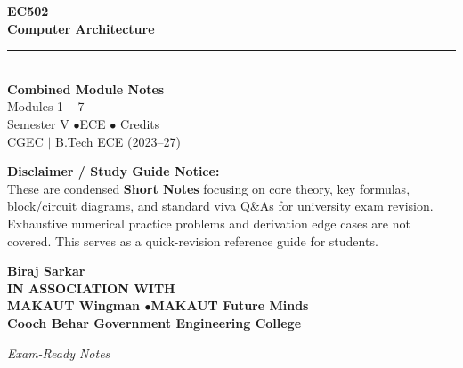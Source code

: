 \documentclass[12pt,a4paper]{article}
\begin{document}
\thispagestyle{empty}


\vspace*{1.0cm}
\begin{center}
  {\Huge\bfseries\color{myred} EC502}\\[10pt]
  {\LARGE\bfseries\color{mydark} Computer Architecture}\\[20pt]
  {\color{myred}\rule{0.7\linewidth}{1.5pt}}\\[18pt]
  {\Large\color{myteal}\textbf{Combined Module Notes}}\\[8pt]
  {\large\color{mydark} Modules 1 -- 7}\\[40pt]
  {\normalsize\color{mydark} Semester V \quad$\bullet$\quad ECE \quad$\bullet$ Credits}\\[12pt]
  {\normalsize\color{mydark} CGEC \;$|$\; B.Tech ECE (2023--27)}
\end{center}
\vspace{1.0cm}
\begin{center}
  \begin{tcolorbox}[colback=mygray, colframe=mgframe, boxrule=0.5pt, arc=3pt, width=0.85\linewidth]
    \centering\small\color{mydark}
    \textbf{Disclaimer / Study Guide Notice:}\\
    These are condensed \textbf{Short Notes} focusing on core theory, key formulas, block/circuit diagrams, and standard viva Q\&As for university exam revision. Exhaustive numerical practice problems and derivation edge cases are not covered. This serves as a quick-revision reference guide for students.
  \end{tcolorbox}
\end{center}
\vfill
\vspace{0.6cm}
\begin{center}
  {\large\bfseries\color{mypurple} Biraj Sarkar}\\[16pt]
  {\footnotesize\color{watermark}\textbf{IN ASSOCIATION WITH}}\\[8pt]
  {\small\bfseries\color{mydark} MAKAUT Wingman \quad$\bullet$\quad MAKAUT Future Minds}\\[12pt]
  {\large\bfseries\color{myteal} Cooch Behar Government Engineering College}
\end{center}
\vfill
\begin{center}{\small\color{watermark}\textit{Exam-Ready Notes}}\end{center}
\clearpage
\end{document}

